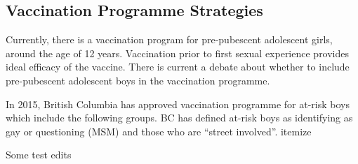 \documentclass[12pt]{article}
\begin{document}
\subsection{Vaccination Programme Strategies}

Currently, there is a vaccination program for pre-pubescent adolescent girls, around the age of 12 years.  Vaccination prior to first sexual experience provides ideal efficacy of the vaccine. There is current a debate about whether to include pre-pubescent adolescent boys in the vaccination programme. 

In 2015, British Columbia has approved vaccination programme for at-risk boys which include the following groups.  BC has defined at-risk boys as identifying as gay or questioning (MSM) and those who are ``street involved''.
{itemize}

Some test edits

\newpage


\end{document}
